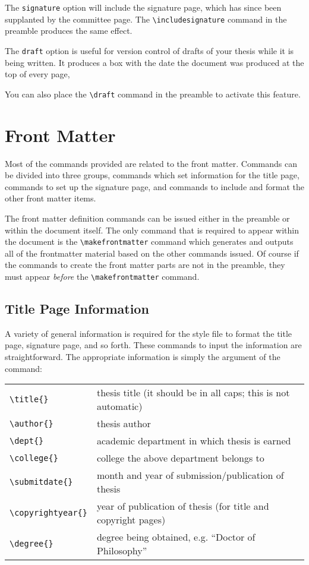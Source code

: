 \documentclass[11pt]{article}
\begin{document}
\begin{singlespace}
The \verb+signature+ option will include the signature page, which has since
been supplanted by the committee page.  The \verb+\includesignature+ command in
the preamble produces the same effect.

The \verb+draft+ option is useful for version control of drafts of your
thesis while it is being written.  It produces a box with the date the document
was produced at the top of every page,

\noindent\usebox{\draftbox}

You can also place the \verb+\draft+ command in the preamble to activate this
feature.

\section*{Front Matter}

Most of the commands provided are related to the front matter.  Commands can be
divided into three groups,  commands which set information for the title page,
commands to set up the signature page, and commands to include and format the
other front matter items.  

The front matter definition commands can be issued either in the preamble or
within the document itself.  The only command that is required to appear within
the document is the \verb+\makefrontmatter+ command which generates and outputs
all of the frontmatter material based on the other commands issued.  Of course
if the commands to create the front matter parts are not in the preamble, they
must appear \emph{before} the \verb+\makefrontmatter+ command.

\subsection*{Title Page Information}

A variety of general information is required for the style file to format the
title page, signature page, and so forth.  These commands to input the
information are straightforward.  The appropriate information is simply the
argument of the command:

\begin{tabular}{ll}
\verb+\title{}+ & thesis title (it should be in all caps; this is not automatic)\\
\verb+\author{}+ & thesis author \\
\verb+\dept{}+ & academic department in which thesis is earned \\
\verb+\college{}+ & college the above department belongs to \\
\verb+\submitdate{}+ & month and year of submission/publication of thesis \\
\verb+\copyrightyear{}+ & year of publication of thesis (for title and copyright
pages) \\
\verb+\degree{}+ & degree being obtained, e.g. ``Doctor of Philosophy'' 
\end{tabular}


\end{singlespace}
\end{document}
